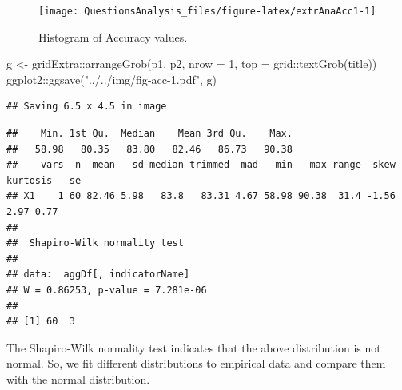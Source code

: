 \documentclass[
]{article}
\newenvironment{Shaded}{\begin{snugshade}}{\end{snugshade}}
\newcommand{\AttributeTok}[1]{\textcolor[rgb]{0.77,0.63,0.00}{#1}}
\newcommand{\DecValTok}[1]{\textcolor[rgb]{0.00,0.00,0.81}{#1}}
\newcommand{\FunctionTok}[1]{\textcolor[rgb]{0.00,0.00,0.00}{#1}}
\newcommand{\NormalTok}[1]{#1}
\newcommand{\OtherTok}[1]{\textcolor[rgb]{0.56,0.35,0.01}{#1}}
\newcommand{\SpecialCharTok}[1]{\textcolor[rgb]{0.00,0.00,0.00}{#1}}
\newcommand{\StringTok}[1]{\textcolor[rgb]{0.31,0.60,0.02}{#1}}
\begin{document}
\begin{figure}

{\centering \texttt{[image: QuestionsAnalysis\_files/figure-latex/extrAnaAcc1-1]} 

}

\caption{Histogram of Accuracy values.}\label{fig:extrAnaAcc1}
\end{figure}

\begin{Shaded}
\begin{Highlighting}[]
\NormalTok{g }\OtherTok{\textless{}{-}}\NormalTok{ gridExtra}\SpecialCharTok{::}\FunctionTok{arrangeGrob}\NormalTok{(p1, p2, }\AttributeTok{nrow =} \DecValTok{1}\NormalTok{, }\AttributeTok{top =}\NormalTok{ grid}\SpecialCharTok{::}\FunctionTok{textGrob}\NormalTok{(title))}
\NormalTok{ggplot2}\SpecialCharTok{::}\FunctionTok{ggsave}\NormalTok{(}\StringTok{"../../img/fig{-}acc{-}1.pdf"}\NormalTok{, g)}
\end{Highlighting}
\end{Shaded}

\begin{verbatim}
## Saving 6.5 x 4.5 in image
\end{verbatim}

\begin{Shaded}
\end{Shaded}

\begin{verbatim}
##    Min. 1st Qu.  Median    Mean 3rd Qu.    Max. 
##   58.98   80.35   83.80   82.46   86.73   90.38 
##    vars  n  mean   sd median trimmed  mad   min   max range  skew kurtosis   se
## X1    1 60 82.46 5.98   83.8   83.31 4.67 58.98 90.38  31.4 -1.56     2.97 0.77
## 
##  Shapiro-Wilk normality test
## 
## data:  aggDf[, indicatorName]
## W = 0.86253, p-value = 7.281e-06
## 
## [1] 60  3
\end{verbatim}

The Shapiro-Wilk normality test indicates that the above distribution is not normal. So, we fit different distributions to empirical data and compare them with the normal distribution.

\begin{Shaded}
\end{Shaded}
\end{document}
